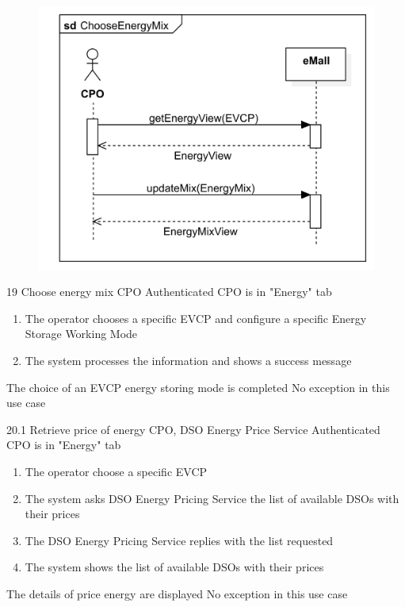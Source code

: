 \pagebreak
\usecase
{
    \begin{figure}[H]
        \centering
        \includegraphics[scale=0.9]{src/sequence_diagram/chooseEnergyMix.png}
    \end{figure}
}
{19}
{Choose energy mix} %
{CPO} %
{Authenticated CPO is in "Energy" tab} %
{ %
    \begin{enumerate}
        \item The operator chooses a specific EVCP and configure a specific Energy Storage Working Mode
        \item The system processes the information and shows a success message
    \end{enumerate}
}
{The choice of an EVCP energy storing mode is completed} %
{ %
    No exception in this use case
}
{ %
}

\usecase
{
}
{20.1}
{Retrieve price of energy} %
{CPO, DSO Energy Price Service} %
{Authenticated CPO is in "Energy" tab} %
{ %
    \begin{enumerate}
        \item The operator choose a specific EVCP
        \item The system asks DSO Energy Pricing Service the list of available DSOs with their prices
        \item The DSO Energy Pricing Service replies with the list requested
        \item The system shows the list of available DSOs with their prices
    \end{enumerate}
}
{The details of price energy are displayed} %
{ %
    No exception in this use case
}
{ %
}

